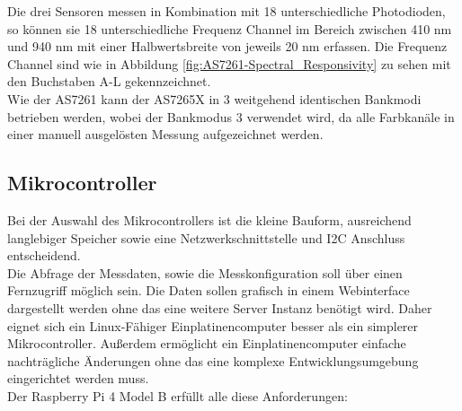 \noindent Die drei Sensoren messen in Kombination mit 18 unterschiedliche Photodioden, so können sie 18 unterschiedliche Frequenz Channel im Bereich zwischen 410 nm und 940 nm mit einer Halbwertsbreite von jeweils 20 nm erfassen.
Die Frequenz Channel sind wie in Abbildung \ref{fig:AS7261-Spectral_Responsivity} zu sehen mit den Buchstaben A-L gekennzeichnet.\\
Wie der AS7261 kann der AS7265X in 3 weitgehend identischen Bankmodi betrieben werden, wobei der Bankmodus 3 verwendet wird, da alle Farbkanäle in einer manuell ausgelösten Messung aufgezeichnet werden.

\subsection{Mikrocontroller}\label{Mikrocontroller}
Bei der Auswahl des Mikrocontrollers ist die kleine Bauform, ausreichend langlebiger Speicher sowie eine Netzwerkschnittstelle und I2C Anschluss entscheidend.\\
Die Abfrage der Messdaten, sowie die Messkonfiguration soll über einen Fernzugriff möglich sein. Die Daten sollen grafisch in einem Webinterface dargestellt werden ohne das eine weitere Server Instanz benötigt wird. Daher eignet sich ein Linux-Fähiger Einplatinencomputer besser als ein simplerer Mikrocontroller.
Außerdem ermöglicht ein Einplatinencomputer einfache nachträgliche Änderungen ohne das eine komplexe Entwicklungsumgebung eingerichtet werden muss.\\

Der Raspberry Pi 4 Model B erfüllt alle diese Anforderungen:

